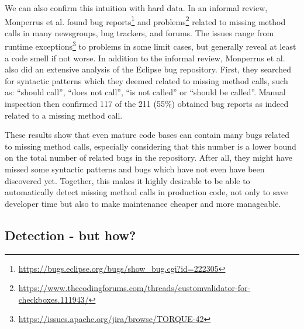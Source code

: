 We can also confirm this intuition with hard data.
In an informal review, Monperrus et al. found bug reports\footnote{\url{https://bugs.eclipse.org/bugs/show_bug.cgi?id=222305}} and problems\footnote{\url{https://www.thecodingforums.com/threads/customvalidator-for-checkboxes.111943/}} related to missing method calls in many newsgroups, bug trackers, and forums.
The issues range from runtime exceptions\footnote{\url{https://issues.apache.org/jira/browse/TORQUE-42}} to problems in some limit cases, but generally reveal at least a code smell if not worse.
In addition to the informal review, Monperrus et al. \cite{monperrus2013detecting} also did an extensive analysis of the Eclipse bug repository.
First, they searched for syntactic patterns which they deemed related to missing method calls, such as: ``should call'', ``does not call'', ``is not called'' or ``should be called''.
Manual inspection then confirmed 117 of the 211 (55\%) obtained bug reports as indeed related to a missing method call.

These results show that even mature code bases can contain many bugs related to missing method calls, especially considering that this number is a lower bound on the total number of related bugs in the repository.
After all, they might have missed some syntactic patterns and bugs which have not even have been discovered yet.
Together, this makes it highly desirable to be able to automatically detect missing method calls in production code, not only to save developer time but also to make maintenance cheaper and more manageable.

\subsection{Detection - but how?}

